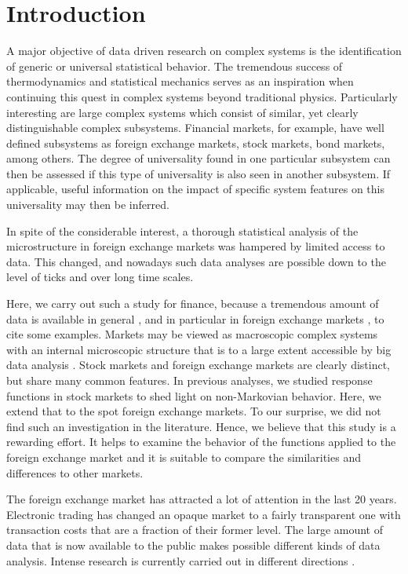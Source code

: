 \section{Introduction}\label{sec:introduction}

A major objective of data driven research on complex systems is the
identification of generic or universal statistical behavior. The tremendous
success of thermodynamics and statistical mechanics serves as an inspiration
when continuing this quest in complex systems beyond traditional physics.
Particularly interesting are large complex systems which consist of similar,
yet clearly distinguishable complex subsystems. Financial markets, for example,
have well defined subsystems as foreign exchange markets, stock markets, bond
markets, among others. The degree of universality found in one particular
subsystem can then be assessed if this type of universality is also seen in
another subsystem. If applicable, useful information on the impact of specific
system features on this universality may then be inferred.

In spite of the considerable interest, a thorough statistical analysis of
the microstructure in foreign exchange markets was hampered by limited access
to data. This changed, and nowadays such data analyses are possible down to the
level of ticks and over long time scales.

Here, we carry out such a study for finance, because  a tremendous amount of
data is available in general
\cite{physicists_contribution,data_01,data_02,data_03,data_04}, and in
particular in foreign exchange markets
\cite{data_05,forex_microstructure,data_06}, to cite some examples. Markets may
be viewed as macroscopic complex systems with an internal microscopic structure
that is to a large extent accessible by big data analysis
\cite{complex_markets}. Stock markets and foreign exchange markets are clearly
distinct, but share many common features. In previous analyses, we studied
response functions in stock markets to shed light on non-Markovian behavior.
Here, we extend that to the spot foreign exchange markets. To our surprise, we
did not find such an investigation in the literature. Hence, we believe that
this study is a rewarding effort. It helps to examine the behavior of the
functions applied to the foreign exchange market and it is suitable to compare
the similarities and differences to other markets.

The foreign exchange market has attracted a lot of attention in the last 20
years. Electronic trading has changed an opaque market to a fairly transparent
one with transaction costs that are a fraction of their former level. The large
amount of data that is now available to the public makes possible different
kinds of data analysis. Intense research is currently carried out in different
directions
\cite{forex_liquidity,info_forex,intraday_forex,forex_structure,teach_spread,forex_microstructure,electronic_forex,forex_algorithmic,curr_speculation,patterns_forex,eur_change_forex,spread_competition,political_forex,forex_volatility,local_forex,forex_inefficiency}.


